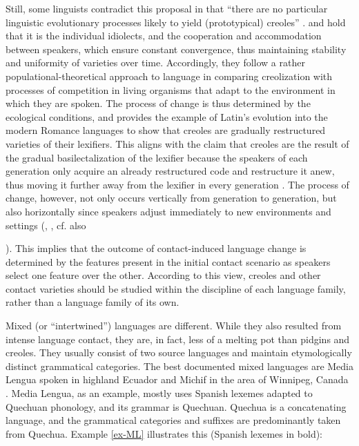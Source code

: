 \documentclass[output=paper,
modfonts
]{langscibook}
\begin{document}
Still, some linguists contradict this proposal in that “there are no particular linguistic evolutionary processes likely to yield (prototypical) creoles” \citep[63]{mufwene2000creolization}. \cite{mufwene2001ecology} and \cite[80]{mufweneetal2017} hold that it is the individual idiolects, and the cooperation and accommodation between speakers, which ensure constant convergence, thus maintaining stability and uniformity of varieties over time. Accordingly, they follow a rather populational-theoretical approach to language \citep[following][]{croft_explaining_2000} in comparing creolization with processes of competition in living organisms that adapt to the environment in which they are spoken. The process of change is thus determined by the ecological conditions, and \cite{mufwene_colonization_2008} provides the example of Latin’s evolution into the modern Romance languages to show that creoles are gradually restructured varieties of their lexifiers. This aligns with the claim that creoles are the result of the gradual basilectalization of the lexifier because the speakers of each generation only acquire an already restructured code and restructure it anew, thus moving it further away from the lexifier in every generation \citep[cf.][]{chaudenson2001creolization}. The process of change, however, not only occurs vertically from generation to generation, but also horizontally since speakers adjust immediately to new environments and settings (\citealt[19]{mufwene_colonization_2008}, \citealt{clements2018speech}, cf. also \citealt{ruchetal_tv}

). This implies that the outcome of contact-induced language change is determined by the features present in the initial contact scenario as speakers select one feature over the other. According to this view, creoles and other contact varieties should be studied within the discipline of each language family, rather than a language family of its own.

Mixed (or “intertwined”) languages are different. While they also resulted from intense language contact, they are, in fact, less of a melting pot than pidgins and creoles. They usually consist of two source languages and maintain etymologically distinct grammatical categories. The best documented mixed languages are Media Lengua spoken in highland Ecuador and Michif in the area of Winnipeg, Canada \citep{bakker1997language,muysken1997media}. Media Lengua, as an example,  mostly uses Spanish lexemes adapted to Quechuan phonology, and its grammar is Quechuan. Quechua is a concatenating language, and the grammatical categories and suffixes are predominantly taken from Quechua. Example \ref{ex-ML} illustrates this (Spanish lexemes in bold):
\end{document}
